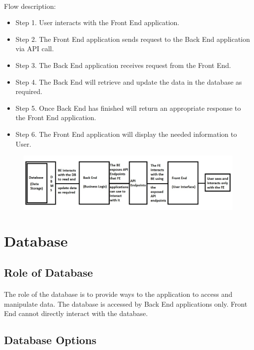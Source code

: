 \documentclass{article}
\begin{document}
\paragraph{} Flow description:
\begin{itemize}
	\item Step 1. User interacts with the Front End application.
	\item Step 2. The Front End application sends request to the Back End application via API call.
	\item Step 3. The Back End application receives request from the Front End.
	\item Step 4. The Back End will retrieve and update the data in the database as required.
	\item Step 5. Once Back End has finished will return an appropriate response to the Front End application.
	\item Step 6. The Front End application will display the needed information to User.
\end{itemize}
\begin{figure}[h]
	\centering
	\includegraphics[width=15cm]{web-applications-architecture.jpg}
\end{figure}


\section{Database}
\subsection{Role of Database}
\paragraph{} The role of the database is to provide ways to the application to access and manipulate data. The database is accessed by Back End applications only. Front End cannot directly interact with the database.
\subsection{Database Options}
\end{document}
